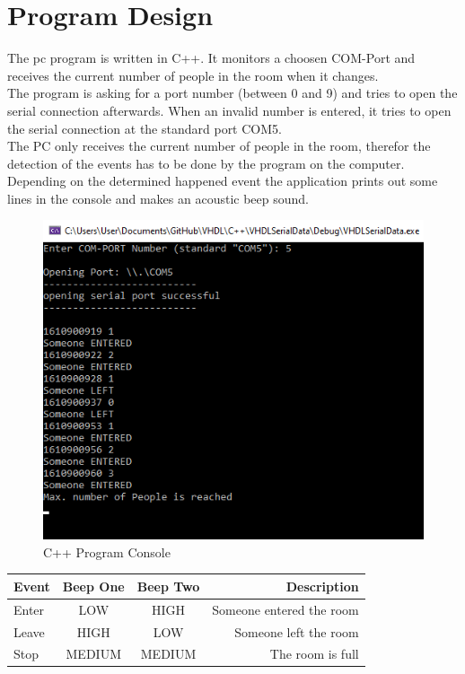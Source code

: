 \documentclass[12pt,a4 paper] {report}
\begin{document}
\chapter{Program Design}
The pc program is written in C++. It monitors a choosen COM-Port and receives the current number of people in the room when it changes.\\
The program is asking for a port number (between 0 and 9) and tries to open the serial connection afterwards. When an invalid number is entered, 
it tries to open the serial connection at the standard port COM5. \\
The PC only receives the current number of people in the room, therefor the detection of the events has to be done by the program on the computer. 
Depending on the determined happened event the application prints out some lines in the console and makes an acoustic beep sound.
\begin{figure}[h]
	\centering	
	\includegraphics[scale=0.8]{../png/program.png}
	\caption{C++ Program Console}
\end{figure}
\begin{center}
	\begin{tabular}{|l|c|c|r|}
		\hline
		\textbf{Event} & \textbf{Beep One} & \textbf{Beep Two} & \textbf{Description} \\
		\hline
		Enter & LOW & HIGH & Someone entered the room \\
		\hline
		Leave & HIGH & LOW & Someone left the room \\
		\hline
		Stop & MEDIUM & MEDIUM & The room is full \\
		\hline
	\end{tabular}
\end{center}
\end{document}
